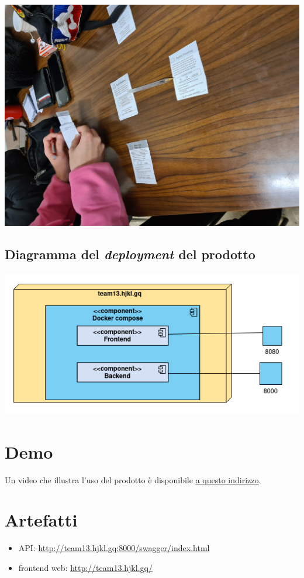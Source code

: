 \documentclass{article}
\begin{document}
\includegraphics[width=\textwidth]{essence-4-4.jpg}

\subsection{Diagramma del \emph{deployment} del prodotto}

\includegraphics[width=\textwidth]{deployment.png}

\section{Demo}

Un video che illustra l'uso del prodotto è disponibile
\underline{\href{https://liveunibo-my.sharepoint.com/:v:/g/personal/federica_grisendi_studio_unibo_it/EaOojpKKw9ZIreuXeDcHFicBxvcOjSGP4zPOGXMwKPtEcA?e=QVfOKm}{a questo indirizzo}}.

\section{Artefatti}

\begin{itemize}
	\item API: \url{http://team13.hjkl.gq:8000/swagger/index.html}
	\item frontend web: \url{http://team13.hjkl.gq/}
\end{itemize}
\end{document}
